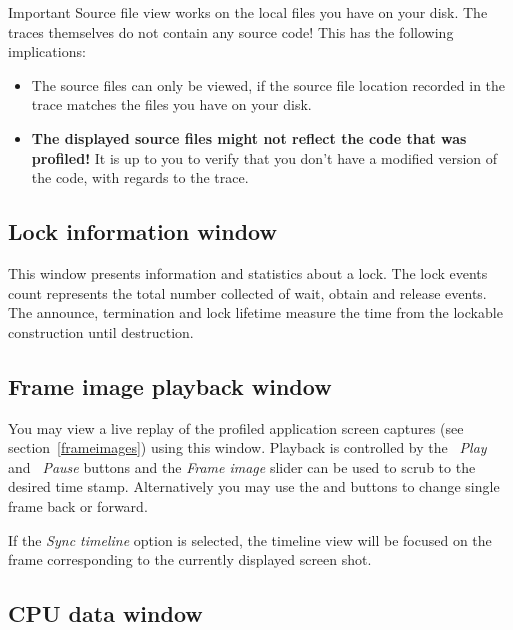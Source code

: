 \documentclass[hidelinks,titlepage,a4paper]{article}
\begin{document}
\begin{bclogo}[
noborder=true,
couleur=black!5,
logo=\bcbombe
]{Important}
Source file view works on the local files you have on your disk. The traces themselves do not contain any source code! This has the following implications:

\begin{itemize}
\item The source files can only be viewed, if the source file location recorded in the trace matches the files you have on your disk.
\item \textbf{The displayed source files might not reflect the code that was profiled!} It is up to you to verify that you don't have a modified version of the code, with regards to the trace.
\end{itemize}
\end{bclogo}

\subsection{Lock information window}
\label{lockwindow}

This window presents information and statistics about a lock. The lock events count represents the total number collected of wait, obtain and release events. The announce, termination and lock lifetime measure the time from the lockable construction until destruction.

\subsection{Frame image playback window}
\label{playback}

You may view a live replay of the profiled application screen captures (see section~\ref{frameimages}) using this window. Playback is controlled by the \emph{\faPlay~Play} and \emph{\faPause~Pause} buttons and the \emph{Frame image} slider can be used to scrub to the desired time stamp. Alternatively you may use the \emph{\faCaretLeft} and \emph{\faCaretRight} buttons to change single frame back or forward.

If the \emph{Sync timeline} option is selected, the timeline view will be focused on the frame corresponding to the currently displayed screen shot.

\subsection{CPU data window}
\label{cpudata}
\end{document}
